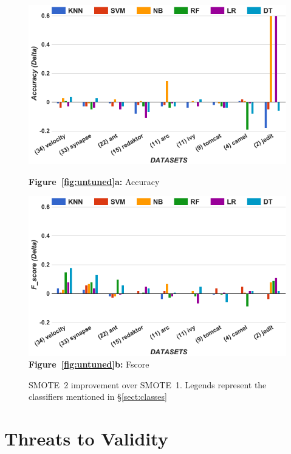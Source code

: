 \documentclass[sigconf,review, anonymous]{acmart}
\theoremstyle{break}
\theoremstyle{break}
\newcommand{\tion}[1]{{\S}\ref{sect:#1}}
\begin{document}


\begin{figure}[!htbp]
\begin{minipage}{.5\linewidth}
\centering
        \includegraphics[width=.95\linewidth]{./fig/acc_tuned.png}
        
  {\bf Figure~\ref{fig:untuned}a:} Accuracy
    \end{minipage}%
\begin{minipage}{.5\linewidth}
        \centering
        \includegraphics[width=.95\linewidth]{./fig/f_tuned.png}
  {\bf Figure~\ref{fig:untuned}b:} Fscore
    \end{minipage}%
    \caption{SMOTE~2 improvement over SMOTE~1. Legends represent the classifiers mentioned in \tion{classes}}
    \label{fig:threats}
\end{figure}

\section{Threats to Validity}
\label{sect:validity}
\end{document}
